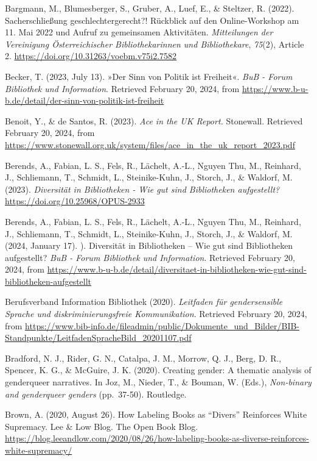 \documentclass[a4paper,
fontsize=11pt,
oneside,
numbers=noperiodatend,
parskip=half-,
bibliography=totoc,
final
]{scrartcl}
\begin{document}
Bargmann, M., Blumesberger, S., Gruber, A., Luef, E., \& Steltzer, R.
(2022). Sacherschließung geschlechtergerecht?! Rückblick auf den
Online-Workshop am 11. Mai 2022 und Aufruf zu gemeinsamen Aktivitäten.
\emph{Mitteilungen der Vereinigung Österreichischer Bibliothekarinnen
und Bibliothekare}, \emph{75}(2), Article 2.
\url{https://doi.org/10.31263/voebm.v75i2.7582}

Becker, T. (2023, July 13). »Der Sinn von Politik ist Freiheit«.
\emph{BuB - Forum Bibliothek und Information}. Retrieved February 20,
2024, from
\url{https://www.b-u-b.de/detail/der-sinn-von-politik-ist-freiheit}

Benoit, Y., \& de Santos, R. (2023). \emph{Ace in the UK Report.}
Stonewall. Retrieved February 20, 2024, from
\url{https://www.stonewall.org.uk/system/files/ace_in_the_uk_report_2023.pdf}

Berends, A., Fabian, L. S., Fels, R., Lächelt, A.-L., Nguyen Thu, M.,
Reinhard, J., Schliemann, T., Schmidt, L., Steinike-Kuhn, J., Storch,
J., \& Waldorf, M. (2023). \emph{Diversität in Bibliotheken - Wie gut
sind Bibliotheken aufgestellt?} \url{https://doi.org/10.25968/OPUS-2933}

Berends, A., Fabian, L. S., Fels, R., Lächelt, A.-L., Nguyen Thu, M.,
Reinhard, J., Schliemann, T., Schmidt, L., Steinike-Kuhn, J., Storch,
J., \& Waldorf, M. (2024, January 17). ). Diversität in Bibliotheken --
Wie gut sind Bibliotheken aufgestellt? \emph{BuB - Forum Bibliothek und
Information}. Retrieved February 20, 2024, from
\url{https://www.b-u-b.de/detail/diversitaet-in-bibliotheken-wie-gut-sind-bibliotheken-aufgestellt}

Berufsverband Information Bibliothek (2020). \emph{Leitfaden für
gendersensible Sprache und diskriminierungsfreie Kommunikation}.
Retrieved February 20, 2024, from
\url{https://www.bib-info.de/fileadmin/public/Dokumente_und_Bilder/BIB-Standpunkte/LeitfadenSpracheBild_20201107.pdf}

Bradford, N. J., Rider, G. N., Catalpa, J. M., Morrow, Q. J., Berg, D.
R., Spencer, K. G., \& McGuire, J. K. (2020). Creating gender: A
thematic analysis of genderqueer narratives. In Joz, M., Nieder, T., \&
Bouman, W. (Eds.), \emph{Non-binary and genderqueer genders}
(pp.~37-50). Routledge.

Brown, A. (2020, August 26). How Labeling Books as \enquote{Divers} Reinforces
White Supremacy. Lee \& Low Blog. The Open Book Blog.
\url{https://blog.leeandlow.com/2020/08/26/how-labeling-books-as-diverse-reinforces-white-supremacy/}
\end{document}
